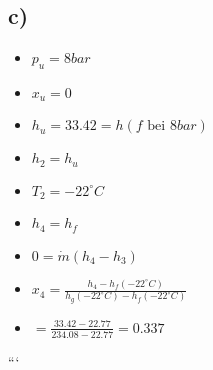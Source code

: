 \subsection*{c)}

\begin{itemize}
    \item $p_u = 8bar$
    \item $x_u = 0$
    \item $h_u = 33.42 = h(f\text{ bei } 8bar)$
    \item $h_2 = h_u$
    \item $T_2 = -22^\circ C$
    \item $h_4 = h_f$
    \item $0 = \dot{m}(h_4 - h_3)$
    \item $x_4 = \frac{h_4 - h_f(-22^\circ C)}{h_g(-22^\circ C) - h_f(-22^\circ C)}$
    \item $= \frac{33.42 - 22.77}{234.08 - 22.77} = 0.337$
\end{itemize}

```